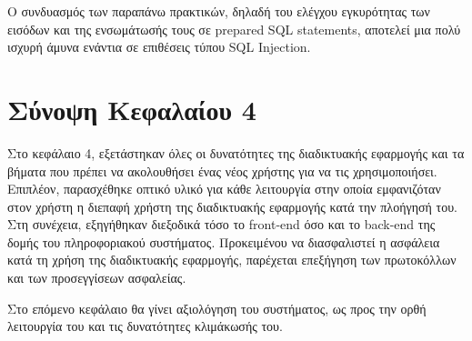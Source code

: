 Ο συνδυασμός των παραπάνω πρακτικών, δηλαδή του ελέγχου εγκυρότητας των εισόδων και της ενσωμάτωσής τους σε prepared SQL statements, αποτελεί μια πολύ ισχυρή άμυνα ενάντια σε επιθέσεις τύπου SQL Injection.

\section{Σύνοψη Κεφαλαίου 4}
Στο κεφάλαιο 4, εξετάστηκαν όλες οι δυνατότητες της διαδικτυακής εφαρμογής και τα βήματα που πρέπει να ακολουθήσει ένας νέος χρήστης για να τις χρησιμοποιήσει. Επιπλέον, παρασχέθηκε οπτικό υλικό για κάθε λειτουργία στην οποία εμφανιζόταν στον χρήστη η διεπαφή χρήστη της διαδικτυακής εφαρμογής κατά την πλοήγησή του. Στη συνέχεια, εξηγήθηκαν διεξοδικά τόσο το front-end όσο και το back-end της δομής του πληροφοριακού συστήματος. Προκειμένου να διασφαλιστεί η ασφάλεια κατά τη χρήση της διαδικτυακής εφαρμογής, παρέχεται επεξήγηση των πρωτοκόλλων και των προσεγγίσεων ασφαλείας.

Στο επόμενο κεφάλαιο θα γίνει αξιολόγηση του συστήματος, ως προς την ορθή λειτουργία του και τις δυνατότητες κλιμάκωσής του.
